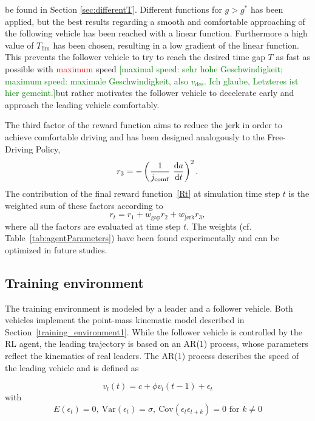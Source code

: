 \documentclass[review]{elsarticle}
\providecommand{\red}[1]{\textcolor{red}{#1}}
\providecommand{\green}[1]{\textcolor{green}{#1}}
\providecommand{\martin}[1]{\red{#1}} %
\providecommand{\martinc}[1]{\green{[#1]}} %
\providecommand{\sub}[1]{_{\mathrm{#1}}}  %
\providecommand{\3}{{\ss}}
\begin{document}
be found in Section \ref{sec:differentT}. Different functions for $g
> g^*$ has been applied, but the best results regarding a smooth and
comfortable approaching of the following vehicle has been reached with
a linear function. Furthermore a high value of $T\sub{lim}$ has been
chosen, resulting in a low gradient of the linear function. This
prevents the follower vehicle to try to reach the desired time gap $T$
as fast as possible with \martin{maximum} speed \martinc{maximal
  speed: sehr hohe Geschwindigkeit; maximum speed: maximale
  Geschwindigkeit, also $v\sub{des}$. Ich glaube, Letzteres ist hier gemeint.}but rather motivates the follower vehicle to decelerate early and approach the leading vehicle comfortably.



The third factor of the reward function aims to reduce the jerk in
order to achieve comfortable driving and has been designed analogously to the Free-Driving Policy, 
\begin{equation}
\label{eq:r3_CFP}
r_3 = -\left(\frac{1}{j\sub{comf}} \ \dv{a}{t}\right)^2.
\end{equation}
%
The contribution of the final reward function~\eqref{Rt}  at simulation time step $t$ is the weighted
sum of these factors according to
\begin{equation}
\label{rt2}
r_t = r_1 + w\sub{gap}r_2+w\sub{jerk}r_3,
\end{equation}
where all the factors are evaluated at time step $t$. The weights (cf.
Table~\ref{tab:agentParameters}) have been found experimentally and
can be optimized in future studies.




\subsection{Training environment}
\label{training_environment2}
The training environment is modeled by a leader and a follower vehicle. Both vehicles implement the point-mass kinematic model described in Section~\ref{training_environment1}. While the follower vehicle is controlled by the RL agent, the  leading trajectory is based on an AR(1) process, whose parameters
reflect the kinematics of real leaders. The AR(1) process describes
the speed of the leading vehicle and is defined as 

\begin{equation} \label{eq:AR1}
v_l(t) = c+\phi v_l(t-1)+ \epsilon_t
\end{equation}
with
\begin{equation}
E(\epsilon_t) = 0, \ \text{Var}(\epsilon_t) = \sigma, \ 
\text{Cov}(\epsilon_t\epsilon_{t+k})=0 \text{ for }k\neq 0
\end{equation}
\end{document}
